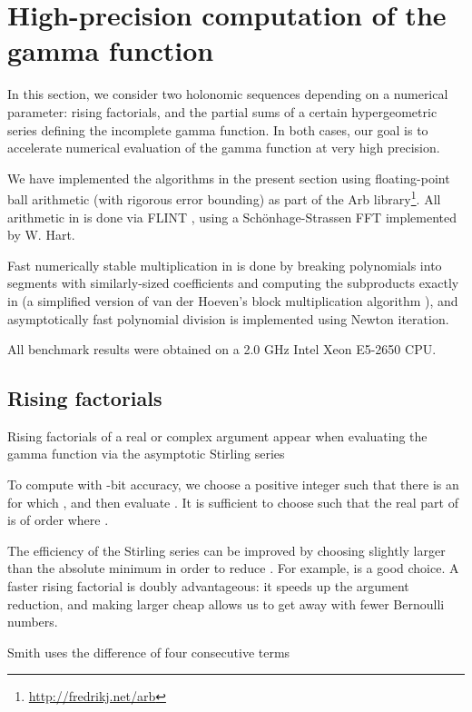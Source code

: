 \documentclass{sig-alternate}
\begin{document}
\section{High-precision computation of the gamma function} \label{sect:casestudy}

In this section, we consider two holonomic sequences depending
on a numerical parameter: rising factorials, and the partial
sums of a certain hypergeometric series defining the incomplete
gamma function. In both cases, our goal is to accelerate numerical
evaluation of the gamma function at very high precision.

We have implemented the algorithms in the present section using
floating-point ball arithmetic (with rigorous error bounding)
as part of the Arb library\footnote{\url{http://fredrikj.net/arb}}.
All arithmetic in  is done via FLINT \cite{Hart2010},
using a Sch\"{o}nhage-Strassen FFT implemented by W. Hart.

Fast numerically stable multiplication in  is
done by breaking polynomials into segments with
similarly-sized coefficients and computing the subproducts
exactly in  (a simplified version of
van der Hoeven's block multiplication algorithm
\cite{vdH:stablemult}), and asymptotically fast
polynomial division is implemented using Newton iteration.

All benchmark results were obtained on a 2.0 GHz Intel Xeon E5-2650 CPU.

\subsection{Rising factorials} \label{sect:rising}

Rising factorials of a real or complex argument appear when
evaluating the gamma function via the asymptotic Stirling series

To compute  with -bit accuracy, we choose a
positive integer  such that there is an  for which
, and then evaluate
.
It is sufficient to choose  such that the
real part of  is of order  where
.

The efficiency of the Stirling series can be improved
by choosing  slightly larger than the absolute minimum
in order to reduce . For example,
 is a good choice.
A faster rising factorial is doubly advantageous: it
speeds up the argument reduction, and making larger  cheap
allows us to get away with fewer Bernoulli numbers.

Smith \cite{Smith2001} uses the difference of four consecutive terms
\end{document}
